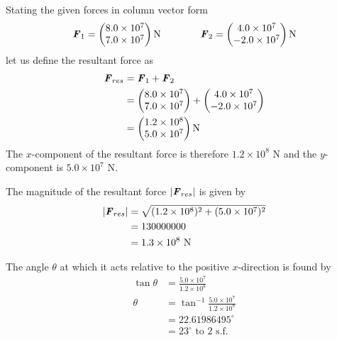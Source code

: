 \documentclass[a4paper,12pt]{article}
\numberwithin{equation}{section}
\begin{document}
\begin{question}

\qpart

\qsubpart
Stating the given forces in column vector form
\[
\textbf{\textit{F}}_1 =
\begin{pmatrix}
8.0\times10^7\\
7.0\times10^7
\end{pmatrix}
\text{N}
\qquad\qquad
\textbf{\textit{F}}_2 =
\begin{pmatrix}
4.0\times10^7\\
-2.0\times10^7
\end{pmatrix}
\text{N}
\]
let us define the resultant force as
\begin{align*}
\textbf{\textit{F}}_{res} &= \textbf{\textit{F}}_1 + \textbf{\textit{F}}_2\\
&=
\begin{pmatrix}
8.0\times10^7\\
7.0\times10^7
\end{pmatrix}
+
\begin{pmatrix}
4.0\times10^7\\
-2.0\times10^7
\end{pmatrix}
\\
&=
\begin{pmatrix}
1.2\times10^8\\
5.0\times10^7
\end{pmatrix}
\text{N}
\end{align*}
The $x$-component of the resultant force is therefore $1.2\times10^8$ N and the $y$-component is $5.0\times10^7$ N.

\qsubpart
The magnitude of the resultant force $|\textbf{\textit{F}}_{res}|$ is given by
\begin{align*}
|\textbf{\textit{F}}_{res}| &= \sqrt{(1.2\times10^8)^2+(5.0\times10^7)^2}\\
&=130000000\\
&=1.3 \times 10^8\text{ N}
\end{align*}

The angle $\theta$ at which it acts relative to the positive $x$-direction is found by
\begin{align*}
\tan\theta &= \frac{5.0 \times 10^7}{1.2 \times 10^8}\\
\theta&=\tan^{-1}\frac{5.0 \times 10^7}{1.2 \times 10^8}\\
&=22.61986495^\circ\\
&=23^\circ\text{ to 2 s.f.}
\end{align*}


\end{question}
\end{document}
